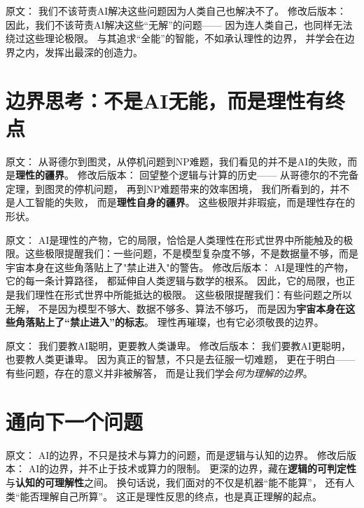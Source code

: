原文：
我们不该苛责AI解决这些问题因为人类自己也解决不了。
修改后版本：
因此，我们不该苛责AI解决这些“无解”的问题——  
因为连人类自己，也同样无法绕过这些理论极限。  
与其追求“全能”的智能，不如承认理性的边界，  
并学会在边界之内，发挥出最深的创造力。

\section*{边界思考：不是AI无能，而是理性有终点}

原文：
从哥德尔到图灵，从停机问题到NP难题，我们看见的并不是AI的失败，而是\textbf{理性的疆界}。
修改后版本：
回望整个逻辑与计算的历史——  
从哥德尔的不完备定理，到图灵的停机问题，  
再到NP难题带来的效率困境，  
我们所看到的，并不是人工智能的失败，  
而是\textbf{理性自身的疆界}。  
这些极限并非瑕疵，而是理性存在的形状。



原文：
AI是理性的产物，它的局限，恰恰是人类理性在形式世界中所能触及的极限。这些极限提醒我们：一些问题，不是模型复杂度不够，不是数据量不够，而是宇宙本身在这些角落贴上了"禁止进入"的警告。
修改后版本：
AI是理性的产物，它的每一条计算路径，  
都延伸自人类逻辑与数学的根系。  
因此，它的局限，也正是我们理性在形式世界中所能抵达的极限。  
这些极限提醒我们：有些问题之所以无解，  
不是因为模型不够大、数据不够多、算法不够巧，  
而是因为\textbf{宇宙本身在这些角落贴上了“禁止进入”的标志}。  
理性再璀璨，也有它必须敬畏的边界。



原文：
我们要教AI聪明，更要教人类谦卑。
修改后版本：
我们要教AI更聪明，也要教人类更谦卑。  
因为真正的智慧，不只是去征服一切难题，  
更在于明白——有些问题，存在的意义并非被解答，  
而是让我们学会\textit{何为理解的边界}。

\section*{通向下一个问题}

原文：
AI的边界，不只是技术与算力的问题，而是逻辑与认知的边界。
修改后版本：
AI的边界，并不止于技术或算力的限制。  
更深的边界，藏在\textbf{逻辑的可判定性}与\textbf{认知的可理解性}之间。  
换句话说，我们面对的不仅是机器“能不能算”，  
还有人类“能否理解自己所算”。  
这正是理性反思的终点，也是真正理解的起点。



